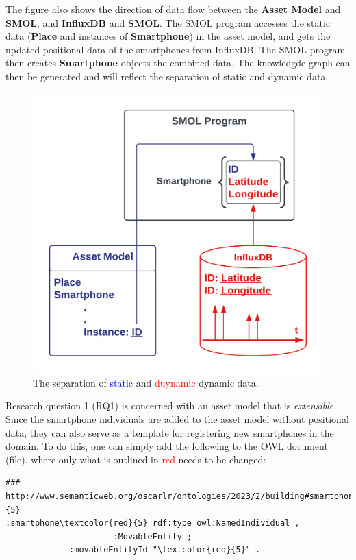 \documentclass{article}
\begin{document}
The figure also shows the direction of data flow between the \textbf{Asset Model} and \textbf{SMOL}, and \textbf{InfluxDB} and \textbf{SMOL}. The SMOL program accesses the static data (\textbf{Place} and instances of \textbf{Smartphone}) in the asset model, and gets the updated positional data of the smartphones from InfluxDB. The SMOL program then creates \textbf{Smartphone} objects the combined data. The knowledgde graph can then be generated and will reflect the separation of static and dynamic data.

\begin{figure}[H]
    \centering
    \includegraphics[scale=0.24]{graphics/static_dynamic_asset_model.png}
    \caption{The separation of \textcolor{blue}{static} and \textcolor{red}{duynamic} dynamic data.}
    \label{fig:static_dynamic_asset_model}
\end{figure}

Research question 1 (RQ1) is concerned with an asset model that is \emph{extensible}. Since the smartphone individuals are added to the asset model without positional data, they can also serve as a template for registering new smartphones in the domain. To do this, one can simply add the following to the OWL document (file), where only what is outlined in \textcolor{red}{red} needs to be changed:

\begin{Verbatim}[commandchars=\\\{\}, breakanywhere=true]
### http://www.semanticweb.org/oscarlr/ontologies/2023/2/building#smartphone\textcolor{red}{5}
:smartphone\textcolor{red}{5} rdf:type owl:NamedIndividual ,
                      :MovableEntity ;
             :movableEntityId "\textcolor{red}{5}" .
\end{Verbatim}
\end{document}
